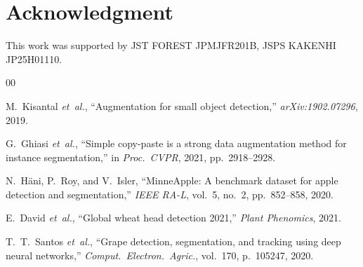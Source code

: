 \documentclass[conference]{IEEEtran}
\begin{document}
\section*{Acknowledgment}
This work was supported by JST FOREST JPMJFR201B,
JSPS KAKENHI JP25H01110.

\begin{thebibliography}{00}

M.~Kisantal \textit{et~al.},
``Augmentation for small object detection,''
\textit{arXiv:1902.07296}, 2019.

G.~Ghiasi \textit{et~al.},
``Simple copy-paste is a strong data augmentation method for
instance segmentation,''
in \textit{Proc.\ CVPR}, 2021, pp.~2918--2928.

N.~H\"{a}ni, P.~Roy, and V.~Isler,
``MinneApple: A benchmark dataset for apple detection and
segmentation,''
\textit{IEEE RA-L}, vol.~5, no.~2, pp.~852--858, 2020.

E.~David \textit{et~al.},
``Global wheat head detection 2021,''
\textit{Plant Phenomics}, 2021.

T.~T.~Santos \textit{et~al.},
``Grape detection, segmentation, and tracking using deep
neural networks,''
\textit{Comput.\ Electron.\ Agric.}, vol.~170, p.~105247, 2020.

\end{thebibliography}
\end{document}
